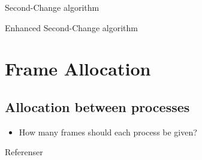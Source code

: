 \documentclass{beamer}
\begin{document}
\begin{frame}{\insertsubsectionhead}{Second-Change algorithm}
\end{frame}

\begin{frame}{\insertsubsectionhead}{Enhanced Second-Change algorithm}
\end{frame}


\section{Frame Allocation}

\subsection{Allocation between processes}

\begin{frame}{\insertsubsectionhead}
  \begin{itemize}
    \item How many frames should each process be given?
  \end{itemize}
\end{frame}

\begin{frame}{\insertsubsectionhead}
\end{frame}



\begin{frame}[allowframebreaks]{Referenser}
  \small
  \printbibliography
\end{frame}
\end{document}
